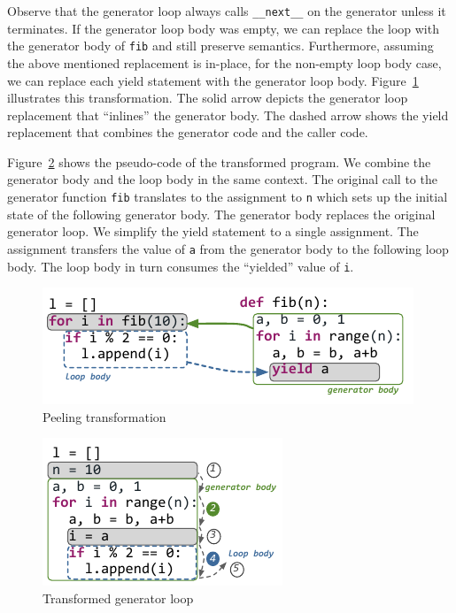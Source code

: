 Observe that the generator loop always calls \texttt{\_\_next\_\_} on the generator unless it terminates.
If the generator loop body was empty, we can replace the loop with the generator body of \texttt{fib} and still preserve semantics.
Furthermore, assuming the above mentioned replacement is in-place, for the non-empty loop body case, we can replace each yield statement with the generator loop body.
Figure~\ref{fig:ch4-peeling-trans} illustrates this transformation.
The solid arrow depicts the generator loop replacement that ``inlines'' the generator body.
The dashed arrow shows the yield replacement that combines the generator code and the caller code.

Figure~\ref{fig:ch4-fib-peeled} shows the pseudo-code of the transformed program.
We combine the generator body and the loop body in the same context.
The original call to the generator function \texttt{fib} translates to the assignment to \texttt{n} which sets up the initial state of the following generator body.
The generator body replaces the original generator loop.
We simplify the yield statement to a single assignment.
The assignment transfers the value of \texttt{a} from the generator body to the following loop body.
The loop body in turn consumes the ``yielded'' value of \texttt{i}.

\begin{figure}[!t]
\centering
\includegraphics[scale=1.5]{figures/ch4-peeling-generator-call}
\caption{Peeling transformation}
\label{fig:ch4-peeling-trans}
\end{figure}

\begin{figure}[!t]
\centering
\includegraphics[scale=1.5]{figures/ch4-fib-peeled}
\caption{Transformed generator loop}
\label{fig:ch4-fib-peeled}
\end{figure}

